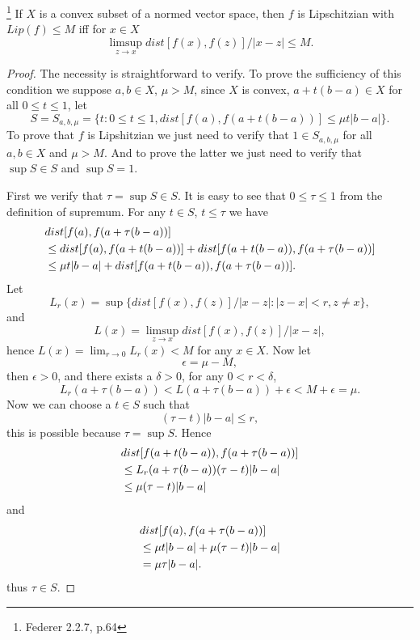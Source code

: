 \begin{lemma}
\footnote{Federer 2.2.7, p.64}
If $X$ is a convex subset of a normed vector space, then $f$ is Lipschitzian 
with $Lip(f)\leq M$ iff for $x\in X$
\[
  \limsup_{z\to x} dist[f(x),f(z)]/|x-z| \leq M.
\]
\end{lemma}
\begin{proof}
The necessity is straightforward to verify.
To prove the sufficiency of this condition we suppose $a,b\in X$, $\mu>M$, since
$X$ is convex, $a+t(b-a)\in X$ for all $0\leq t\leq 1$, let
\[
  S=S_{a,b,\mu}=\{ t: 0\leq t\leq 1, dist[f(a),f(a+t(b-a))]\leq \mu t|b-a| \}.
\]
To prove that $f$ is Lipshitzian we just need to verify that $1\in S_{a,b,\mu}$
for all $a,b\in X$ and $\mu>M$. And to prove the latter we just need to verify
that $\sup S\in S$ and $\sup S=1$.

First we verify that $\tau=\sup S\in S$. It is easy to see that 
$0\leq\tau\leq 1$ from the definition of supremum. For any $t\in S$, 
$t\leq \tau$ we have
\begin{align*}
  &dist[f(a),f(a+\tau (b-a))]  \\ \notag
  &\leq dist[f(a),f(a+t(b-a))] + dist[f(a+t(b-a)),f(a+\tau (b-a))] \\ \notag
  &\leq \mu t |b-a| + dist[f(a+t(b-a)),f(a+\tau (b-a))] \notag.
\end{align*}
Let 
\[
  L_r(x) = \sup\{ dist[f(x),f(z)]/|x-z| : |z-x|<r, z\neq x \},
\]
and
\[
  L(x) = \limsup_{z\to x} dist[f(x),f(z)]/|x-z|,
\]
hence $L(x)=\lim_{r\to 0} L_r(x) < M$ for any $x\in X$.
Now let
\[
  \epsilon = \mu - M,
\]
then $\epsilon>0$, and there exists a $\delta>0$, for any $0<r<\delta$, 
\[
  L_r(a+\tau (b-a)) < L(a+\tau (b-a)) + \epsilon < M + \epsilon = \mu.
\]
Now we can choose a $t\in S$ such that 
\[
  (\tau-t)|b-a| \leq r,
\]
this is possible because $\tau=\sup S$. Hence
\begin{align*}
  & dist[f(a+t(b-a)),f(a+\tau (b-a))]  \notag \\
  &\leq L_r(a+\tau (b-a)) (\tau - t) |b-a|  \notag \\
  &\leq \mu (\tau-t) |b-a|  \notag
\end{align*}
and
\begin{align*}
  &dist[f(a),f(a+\tau (b-a))]  \\ \notag
  &\leq \mu t |b-a| + \mu (\tau -t)|b-a| \\ \notag
  &= \mu \tau |b-a|.  \notag
\end{align*}
thus $\tau\in S$.


\end{proof}
